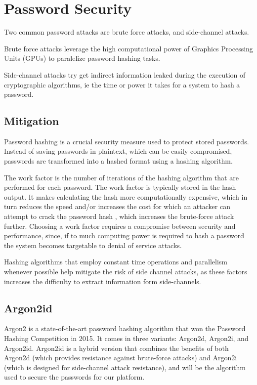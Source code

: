 \section{Password Security}\label{sec:security}

Two common password attacks are brute force attacks, and side-channel attacks.

Brute force attacks leverage the high computational power of Graphics Processing Units (GPUs) to paralelize password hashing tasks.

Side-channel attacks try get indirect information leaked during the execution of cryptographic algorithms, ie the time or power it takes for a system to hash a password.

\subsection{Mitigation}

Password hashing is a crucial security measure used to protect stored passwords. Instead of saving passwords in plaintext, which can be easily compromised, passwords are transformed into a hashed format using a hashing algorithm.

The work factor is the number of iterations of the hashing algorithm that are performed for each password. The work factor is typically stored in the hash output. It makes calculating the hash more computationally expensive, which in turn reduces the speed and/or increases the cost for which an attacker can attempt to crack the password hash \cite{owasp_password_storage}, which increases the brute-force attack further.
Choosing a work factor requires a compromise between security and performance, since, if to much computing power is required to hash a password the system becomes targetable to denial of service attacks.

Hashing algorithms that employ constant time operations and parallelism whenever possible help mitigate the risk of side channel attacks, as these factors increases the difficulty to extract information form side-channels.  


\subsection{Argon2id}
Argon2\cite{rfc9106} is a state-of-the-art password hashing algorithm that won the Password Hashing Competition in 2015. It comes in three variants: Argon2d, Argon2i, and Argon2id. Argon2id is a hybrid version that combines the benefits of both Argon2d (which provides resistance against brute-force attacks) and Argon2i (which is designed for side-channel attack resistance), and will be the algorithm used to secure the passwords for our platform.

